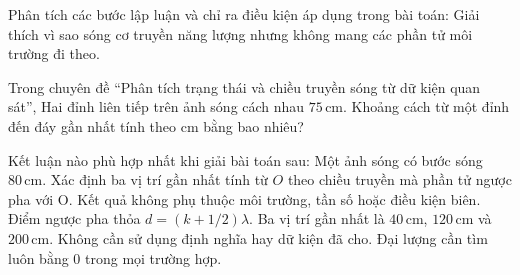 \begin{ex}
Phân tích các bước lập luận và chỉ ra điều kiện áp dụng trong bài toán: Giải thích vì sao sóng cơ truyền năng lượng nhưng không mang các phần tử môi trường đi theo.
\choiceTF

\end{ex}

\begin{ex}
Trong chuyên đề “Phân tích trạng thái và chiều truyền sóng từ dữ kiện quan sát”, Hai đỉnh liên tiếp trên ảnh sóng cách nhau $75\,\text{cm}$. Khoảng cách từ một đỉnh đến đáy gần nhất tính theo cm bằng bao nhiêu?
\end{ex}

\begin{ex}
Kết luận nào phù hợp nhất khi giải bài toán sau: Một ảnh sóng có bước sóng $80\,\text{cm}$. Xác định ba vị trí gần nhất tính từ $O$ theo chiều truyền mà phần tử ngược pha với O.
\choice
{Kết quả không phụ thuộc môi trường, tần số hoặc điều kiện biên.}
{\True Điểm ngược pha thỏa $d=(k+1/2)\lambda$. Ba vị trí gần nhất là $40\,\text{cm}$, $120\,\text{cm}$ và $200\,\text{cm}$.}
{Không cần sử dụng định nghĩa hay dữ kiện đã cho.}
{Đại lượng cần tìm luôn bằng 0 trong mọi trường hợp.}
\end{ex}

